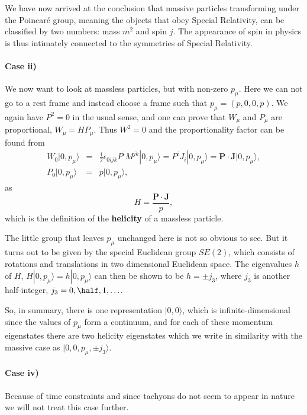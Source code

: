\documentclass[notes.tex]{subfiles}
\begin{document}
We have now arrived at the conclusion that massive particles transforming under the Poincaré group, meaning the objects that obey Special Relativity, can be classified by two numbers: mass $m^2$ and spin $j$. The appearance of spin in physics is thus intimately connected to the symmetries of Special Relativity.

\paragraph{Case ii)} We now want to look at massless particles, but  with non-zero $p_\mu$. Here we can not go to a rest frame and instead choose a frame such that $p_\mu=(p,0,0,p)$. We again have $P^2=0$  in the usual sense, and one can prove that $W_\mu$ and $P_\mu$ are proportional, $W_\mu=H P_\mu$. Thus $W^2=0$ and the proportionality factor  can be found from
\begin{eqnarray*}
W_0 |0, p_\mu\rangle &=& \frac{1}{2} \epsilon_{0 ijk}P^i M^{jk}  |0, p_\mu\rangle=P^i J_i  |0, p_\mu\rangle=\mathbf P\cdot\mathbf J |0, p_\mu\rangle, \\
P_0 |0, p_\mu\rangle &=& p |0, p_\mu\rangle,
\end{eqnarray*}
as 
\[ H = \frac{\mathbf P\cdot\mathbf J }{p}, \]
which is the definition of the {\bf helicity} of a massless particle. 

The little group that leaves $p_\mu$ unchanged here is not so obvious to see. But it turns out to be given by the special Euclidean group $SE(2)$, which consists of rotations and translations in two dimensional Euclidean space.
The eigenvalues $h$ of $H$, $H|0,p_\mu\rangle=h|0,p_\mu\rangle$  can then be shown to be $h=\pm j_3$, where $j_3$ is another half-integer, $j_3=0,\half,1,\ldots$.

So, in summary,  there is one representation $|0,0\rangle$, which is infinite-dimensional since the values of $p_\mu$ form a continuum, and for each of these momentum eigenstates there are two helicity eigenstates which we write in similarity with the massive case as $|0,0,p_\mu,\pm j_3\rangle$. 


\paragraph{Case iv)} Because of time constraints and since tachyons do not seem to appear in nature we will not treat this case further.
\end{document}
